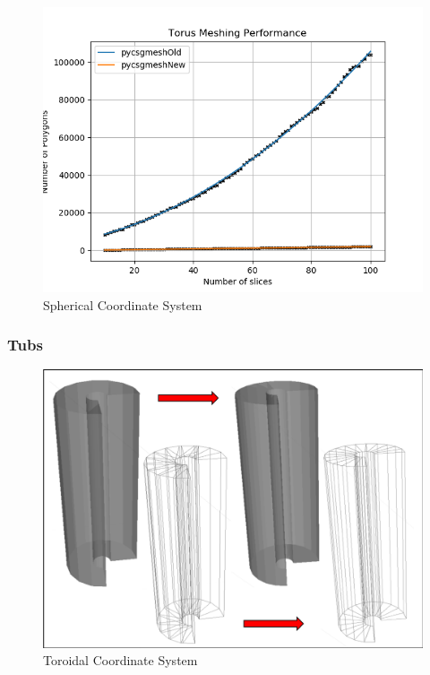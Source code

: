 \documentclass[12pt,a4paper]{article}
\begin{document}
\begin{figure}[h!]
\centering
\includegraphics[scale=0.5]{Images//Quad_fits//Torus_quad.png}
\caption[width=\columnwidth]{Spherical Coordinate System}
\label{conts}
\end{figure}


\subsubsection{Tubs}

\begin{figure}[h!]
\centering
\includegraphics[scale=0.5]{Images//Meshes//tubs.png}
\caption[width=\columnwidth]{Toroidal Coordinate System}
\label{conts}
\end{figure}
\end{document}
